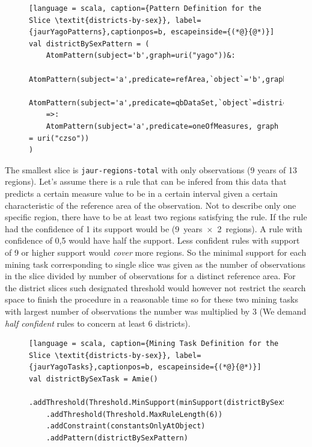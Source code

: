 \begin{figure}[h]
\begin{lstlisting}[language = scala, caption={Pattern Definition for the Slice \textit{districts-by-sex}}, label={jaurYagoPatterns},captionpos=b, escapeinside={(*@}{@*)}]
val districtBySexPattern = (
    AtomPattern(subject='b',graph=uri("yago"))&:
    AtomPattern(subject='a',predicate=refArea,`object`='b',graph=uri("czso"))&:
    AtomPattern(subject='a',predicate=qbDataSet,`object`=districtBySexSlice,graph=uri("czso"))
    =>: 
    AtomPattern(subject='a',predicate=oneOfMeasures, graph = uri("czso"))
)
\end{lstlisting}
\end{figure}

The smallest slice is \verb|jaur-regions-total| with only  observations (9 years of 13 regions). Let's assume there is a rule that can be infered from this data that predicts a certain measure value to be in a certain interval given a certain characteristic of the reference area of the observation. Not to describe only one specific region, there have to be at least two regions satisfying the rule. If the rule had the confidence of 1 its support would be  (9~years~$\times$~2~regions). A rule with confidence of 0,5 would have half the support. Less confident rules with support of 9 or higher support would \textit{cover} more regions. So the minimal support for each mining task corresponding to single slice was given as the number of observations in the slice divided by number of observations for a distinct reference area. For the district slices such designated threshold would however not restrict the search space to finish the procedure in a reasonable time so for these two mining tasks with largest number of observations the number was multiplied by 3 (We demand \textit{half confident} rules to concern at least 6 districts).

\begin{figure}[h]
\begin{lstlisting}[language = scala, caption={Mining Task Definition for the Slice \textit{districts-by-sex}}, label={jaurYagoTasks},captionpos=b, escapeinside={(*@}{@*)}]
val districtBySexTask = Amie()
    .addThreshold(Threshold.MinSupport(minSupport(districtBySexSlice)*3))
    .addThreshold(Threshold.MaxRuleLength(6))
    .addConstraint(constantsOnlyAtObject)
    .addPattern(districtBySexPattern)
\end{lstlisting}
\end{figure}

